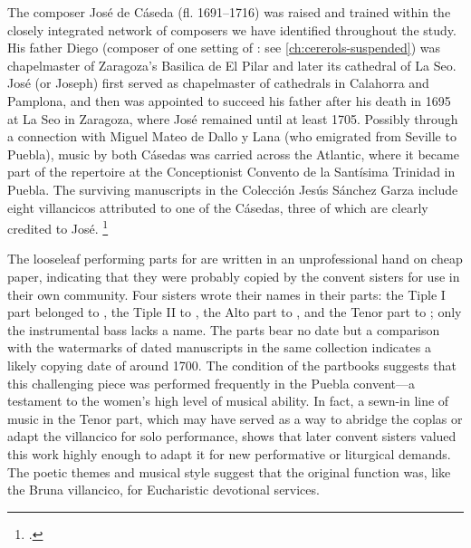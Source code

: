 The composer José de Cáseda (fl. 1691--1716) was raised and trained within the
closely integrated network of composers we have identified throughout the
study.%
    \Autocites
    [120--121]{Calahorra:Zaragoza2}
    {Stevenson:CasedaD}
His father Diego (composer of one setting of : see
\cref{ch:cererols-suspended}) was chapelmaster of Zaragoza's Basilica de El
Pilar and later its cathedral of La Seo.
José (or Joseph) first served as chapelmaster of cathedrals in Calahorra and
Pamplona, and then was appointed to succeed his father after his death in 1695
at La Seo in Zaragoza, where José remained until at least 1705.
Possibly through a connection with Miguel Mateo de Dallo y Lana (who emigrated
from Seville to Puebla), music by both Cásedas was carried across the Atlantic,
where it became part of the repertoire at the Conceptionist Convento de la
Santísima Trinidad in Puebla.%
The surviving manuscripts in the Colección Jesús Sánchez Garza include eight
villancicos attributed to one of the Cásedas, three of which are clearly
credited to José.%
    \footnote{.}

The looseleaf performing parts for  are written in an
unprofessional hand on cheap paper, indicating that they were probably copied
by the convent sisters for use in their own community.
Four sisters wrote their names in their parts:
the Tiple I part belonged to , the Tiple II to , the Alto part to , and the Tenor part
to ; only the instrumental bass lacks a name.
The parts bear no date but a comparison with the watermarks of dated
manuscripts in the same collection indicates a likely copying date of around
1700.
The condition of the partbooks suggests that this challenging piece was
performed frequently in the Puebla convent---a testament to the women's high
level of musical ability.%
    \citXXX[cesar]
In fact, a sewn-in line of music in the Tenor part, which may have served as a
way to abridge the coplas or adapt the villancico for solo performance, shows
that later convent sisters valued this work highly enough to adapt it for new
performative or liturgical demands.
The poetic themes and musical style suggest that the original function was,
like the Bruna villancico, for Eucharistic devotional services.


